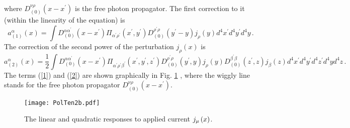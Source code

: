 \documentclass[12pt]{article}
\begin{document}
where $D_{(0)}^{\nu \rho }(x-x^{\prime })$ is the free photon propagator.
The first correction to it (within the linearity of the equation) is%
\begin{equation}
a_{(1)}^{\alpha }\left( x\right) =\int D_{(0)}^{\alpha \alpha ^{\prime
}}(x-x^{\prime })\Pi _{\alpha ^{\prime }\rho ^{\prime }}\left( x^{\prime
},y^{\prime }\right) D_{(0)}^{\rho ^{\prime }\rho }(y^{\prime }-y)j_{\rho
}\left( y\right) d^{4}x^{\prime }d^{4}y^{\prime }d^{4}y\,.  \label{1}
\end{equation}%
The correction of the second power of the perturbation $j_{\rho }\left(
x\right) $ is 
\begin{equation}
a_{(2)}^{\alpha }\left( x\right) =\frac{1}{2}\int D_{(0)}^{\alpha \alpha
^{\prime }}(x-x^{\prime })\Pi _{\alpha ^{\prime }\rho ^{\prime }\beta
^{\prime }}\left( x^{\prime },y^{\prime },z^{\prime }\right) D_{(0)}^{\rho
^{\prime }\rho }(y^{\prime },y)j_{\rho }\left( y\right) D_{(0)}^{\beta
^{\prime }\beta }(z^{\prime },z)j_{\beta }\left( z\right) d^{4}x^{\prime
}d^{4}y^{\prime }d^{4}z^{\prime }d^{4}yd^{4}z\,.  \label{2}
\end{equation}%
The terms (\ref{1}) and (\ref{2}) are shown graphically in Fig. \ref{Fig0.2}%
, where the wiggly line stands for the free photon propagator $D_{(0)}^{\nu
\rho }(x-x^{\prime })$.

\begin{figure}[th!]
\begin{center}
\texttt{[image: PolTen2b.pdf]}
\end{center}
\caption{The linear and quadratic responses to applied current $j_{\protect%
\mu }\left( x\right) $.}
\label{Fig0.2}
\end{figure}
\end{document}
